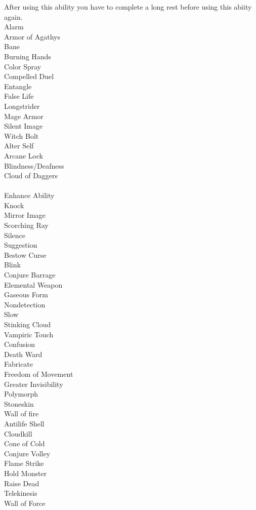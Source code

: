 \documentclass[a4paper]{article}
\begin{document}
\begin{multicols}{2}
After using this ability you have to complete a long rest before using this abiity again.\\
\newpage
{}
Alarm\\
Armor of Agathys\\
Bane\\
Burning Hands\\
Color Spray\\
Compelled Duel\\
Entangle\\
False Life\\
Longstrider\\
Mage Armor\\
Silent Image\\
Witch Bolt\\

Alter Self\\
Arcane Lock\\
Blindness/Deafness\\
Cloud of Daggers\\\\
Enhance Ability\\
Knock\\
Mirror Image\\
Scorching Ray\\
Silence\\
Suggestion\\

Bestow Curse\\
Blink\\
Conjure Barrage\\
Elemental Weapon\\
Gaseous Form\\
Nondetection\\
Slow\\
Stinking Cloud\\
Vampiric Touch\\

Confusion\\
Death Ward\\
Fabricate\\
Freedom of Movement\\
Greater Invisibility\\
Polymorph\\
Stoneskin\\
Wall of fire\\

Antilife Shell\\
Cloudkill\\
Cone of Cold\\
Conjure Volley\\
Flame Strike\\
Hold Monster\\
Raise Dead\\
Telekinesis\\
Wall of Force\\
\end{multicols}
\end{document}
